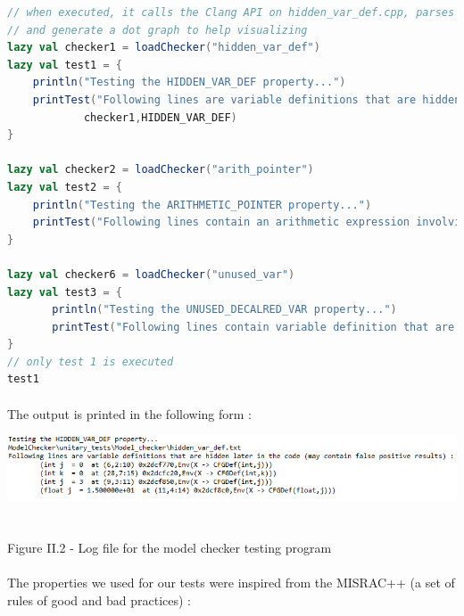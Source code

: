 \documentclass{report}
\begin{document}
\begin{lstlisting}[language=scala]
// when executed, it calls the Clang API on hidden_var_def.cpp, parses the AST file, convert it into a CFG,
// and generate a dot graph to help visualizing
lazy val checker1 = loadChecker("hidden_var_def")
lazy val test1 = {
	println("Testing the HIDDEN_VAR_DEF property...")
	printTest("Following lines are variable definitions that are hidden later in the code (may contain false positive results) :",
			checker1,HIDDEN_VAR_DEF)
}
	
lazy val checker2 = loadChecker("arith_pointer")
lazy val test2 = {
	println("Testing the ARITHMETIC_POINTER property...")
	printTest("Following lines contain an arithmetic expression involving a pointer :",checker2,ARITHMETIC_POINTER)
}

lazy val checker6 = loadChecker("unused_var")
lazy val test3 = {
       println("Testing the UNUSED_DECALRED_VAR property...")
       printTest("Following lines contain variable definition that are not used :",checker3,UNUSED_DECALRED_VAR)
}
// only test 1 is executed
test1
\end{lstlisting}
\paragraph{}
\hspace{4mm}\textnormal{The output is printed in the following form :}

\begin{center}
\includegraphics[scale=0.8]{data/test-log2}
~\\~\\Figure II.2 - Log file for the model checker testing program
\end{center}

\paragraph{}
\hspace{4mm}\textnormal{The properties we used for our tests were inspired from the MISRAC++ (a set of rules of good and bad practices) :}
\end{document}
